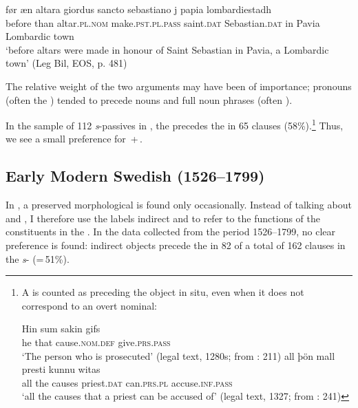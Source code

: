 \documentclass[output=paper]{langscibook}
\begin{document}
\ex
\gll før      æn    altara        giordus          sancto      sebastiano j  papia   lombardiestadh\\
      before  than     altar\textsc{.pl.nom}  make.\textsc{pst.pl.pass}  saint.\textsc{dat}  Sebastian.\textsc{dat}       in Pavia    {Lombardic    town}\\
\glt ‘before altars were made in honour of Saint Sebastian in Pavia, a Lombardic town’ (Leg Bil, EOS, p. 481)
\z
\z


The relative weight of the two arguments may have been of importance; pronouns (often the ) tended to precede nouns and full noun phrases (often ).  


In the sample of 112  \textit{s}{}-passives in , the  precedes the  in 65 clauses (58\%).\footnote{A  is counted as preceding the object in situ, even when it does not correspond to an overt nominal:\label{fn:02:13}

\ea \gll Hin  sum  sakin          gifs\\
         he    that  cause.\textsc{nom.def}  give.\textsc{prs.pass}\\
    \glt ‘The person who is prosecuted’ (legal text, 1280s; from \citealt{Holm1952}: 211)
\ex \gll all    þön   mall  presti      kunnu  witas\\
         all    the    causes  priest.\textsc{dat}    can.\textsc{prs.pl}  accuse.\textsc{inf.pass}\\
    \glt ‘all the causes that a priest can be accused of’ (legal text, 1327; from \citealt{Holm1952}: 241)
\z} Thus, we see a small preference for \,+\,.


\subsection{Early Modern Swedish (1526–1799)}\label{sec:falk:3.4}\largerpage[2]


In , a preserved morphological  is found only occasionally. Instead of talking about  and , I therefore use the labels indirect and  to refer to the functions of the constituents in the . In the data collected from the period 1526–1799, no clear preference is found: indirect objects precede the  in 82 of a total of 162 clauses in the \textit{s}{}- (=\,51\%).
\end{document}
